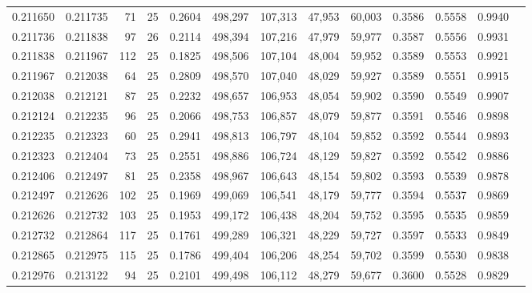 \begin{tabular}{rrrrrrrrrrrrr}
0.211650 & 0.211735 &    71 &  25 &                                     0.2604 & 498,297 & 107,313 &  47,953 &  60,003 & 0.3586 & 0.5558 & 0.9940 \\
0.211736 & 0.211838 &    97 &  26 &                                     0.2114 & 498,394 & 107,216 &  47,979 &  59,977 & 0.3587 & 0.5556 & 0.9931 \\
0.211838 & 0.211967 &   112 &  25 &                                     0.1825 & 498,506 & 107,104 &  48,004 &  59,952 & 0.3589 & 0.5553 & 0.9921 \\
0.211967 & 0.212038 &    64 &  25 &                                     0.2809 & 498,570 & 107,040 &  48,029 &  59,927 & 0.3589 & 0.5551 & 0.9915 \\
0.212038 & 0.212121 &    87 &  25 &                                     0.2232 & 498,657 & 106,953 &  48,054 &  59,902 & 0.3590 & 0.5549 & 0.9907 \\
0.212124 & 0.212235 &    96 &  25 &                                     0.2066 & 498,753 & 106,857 &  48,079 &  59,877 & 0.3591 & 0.5546 & 0.9898 \\
0.212235 & 0.212323 &    60 &  25 &                                     0.2941 & 498,813 & 106,797 &  48,104 &  59,852 & 0.3592 & 0.5544 & 0.9893 \\
0.212323 & 0.212404 &    73 &  25 &                                     0.2551 & 498,886 & 106,724 &  48,129 &  59,827 & 0.3592 & 0.5542 & 0.9886 \\
0.212406 & 0.212497 &    81 &  25 &                                     0.2358 & 498,967 & 106,643 &  48,154 &  59,802 & 0.3593 & 0.5539 & 0.9878 \\
0.212497 & 0.212626 &   102 &  25 &                                     0.1969 & 499,069 & 106,541 &  48,179 &  59,777 & 0.3594 & 0.5537 & 0.9869 \\
0.212626 & 0.212732 &   103 &  25 &                                     0.1953 & 499,172 & 106,438 &  48,204 &  59,752 & 0.3595 & 0.5535 & 0.9859 \\
0.212732 & 0.212864 &   117 &  25 &                                     0.1761 & 499,289 & 106,321 &  48,229 &  59,727 & 0.3597 & 0.5533 & 0.9849 \\
0.212865 & 0.212975 &   115 &  25 &                                     0.1786 & 499,404 & 106,206 &  48,254 &  59,702 & 0.3599 & 0.5530 & 0.9838 \\
0.212976 & 0.213122 &    94 &  25 &                                     0.2101 & 499,498 & 106,112 &  48,279 &  59,677 & 0.3600 & 0.5528 & 0.9829 \\

\end{tabular}
